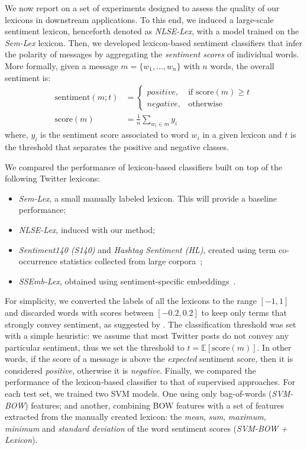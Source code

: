 \documentclass[letterpaper]{article}
\newcommand{\newcite}[1]{\citeauthor{#1} \shortcite{#1}}
\begin{document}
We now report on a set of experiments designed to assess the quality of our lexicons in downstream applications. To this end, we induced a large-scale sentiment lexicon, henceforth denoted as \textsl{NLSE-Lex}, with a model trained on the \textsl{Sem-Lex} lexicon. Then, we developed lexicon-based sentiment classifiers that infer the polarity of messages by aggregating the \textit{sentiment scores} of individual words. More formally, given a message ${m=\{w_1,\ldots,w_n\}}$ with $n$ words, the overall sentiment is:
\begin{align}
    \text{sentiment}(m;t) &= 
\begin{cases}
    positive, & \text{if } \text{score}(m) \geq t\\
    negative,              & \text{otherwise}
\end{cases} \\
		\text{score}(m) &= \frac{1}{n}\sum_{w_i \in m}y_i
\end{align}
\noindent where, $y_i$ is the sentiment score associated to word $w_i$ in a given lexicon and $t$ is the threshold that separates the positive and negative classes.

We compared the performance of lexicon-based classifiers built on top of the following Twitter lexicons: 

\begin{itemize}
\item \textsl{Sem-Lex}, a small manually labeled lexicon. This will provide a baseline performance;
\item \textsl{NLSE-Lex}, induced with our method;
\item \textsl{Sentiment140 (S140)} and \textsl{Hashtag Sentiment (HL)}, created using term co-occurrence statistics collected from large corpora~\cite{kiritchenko2014sentiment};
\item \textsl{SSEmb-Lex}, obtained using sentiment-specific embeddings~\cite{tang-EtAl2014}.
\end{itemize}

For simplicity, we converted the labels of all the lexicons to the range $[-1, 1]$ and  discarded words with scores between $[-0.2, 0.2]$ to keep only terms that strongly convey sentiment, as suggested by \newcite{dodds2011temporal}. The classification threshold was set with a simple heuristic: we assume that most Twitter posts do not convey any particular sentiment, thus we set the threshold to ${t=\mathbb{E}[\text{score}(m)]}$. In other words, if the score of a message is above the \textit{expected} sentiment score, then it is considered \textit{positive}, otherwise it is \textit{negative}. Finally, we compared the performance of the lexicon-based classifier to that of supervised approaches. For each test set, we trained two SVM models. One using only bag-of-words (\textsl{SVM-BOW}) features; and another, combining BOW features with a set of features extracted from the manually created lexicon: the \textit{mean}, \textit{sum}, \textit{maximum}, \textit{minimum} and \textit{standard deviation} of the word sentiment scores (\textsl{SVM-BOW + Lexicon}).
\end{document}
